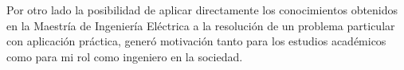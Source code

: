 \documentclass{article}
\begin{document}
Por otro lado la posibilidad de aplicar directamente los conocimientos obtenidos en la Maestría de Ingeniería Eléctrica a la resolución de un problema particular con aplicación práctica, generó motivación tanto para los estudios académicos como para mi rol como ingeniero en la sociedad.  



\newpage



\end{document}

